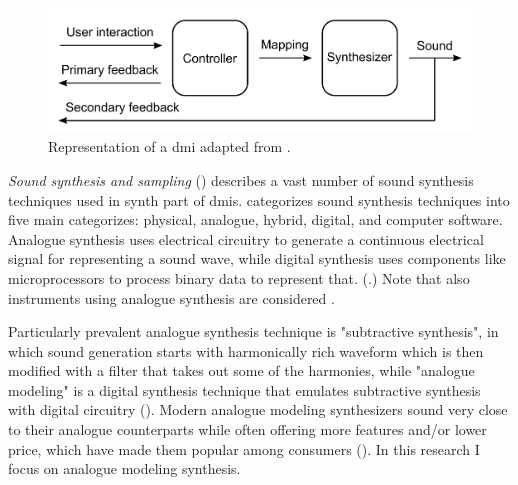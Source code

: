 \begin{figure}[h]
	\centering
	\includegraphics[width=0.8\linewidth]{figures/dmi.png}
	\caption{Representation of a \gls{dmi} adapted from \textcite{miranda-wanderley2006}.}
	\label{dmi}
\end{figure}

\textit{Sound synthesis and sampling} (\cite{russ2009}) describes a vast number of sound synthesis techniques used in \gls{synth} part of \glspl{dmi}. \textcite{russ2009} categorizes sound synthesis techniques into five main categorizes: physical, analogue, hybrid, digital, and computer software. Analogue synthesis uses electrical circuitry to generate a continuous electrical signal for representing a sound wave, while digital synthesis uses components like microprocessors to process binary data to represent that. (\cite{russ2009}.) Note that also instruments using analogue synthesis are considered .

Particularly prevalent analogue synthesis technique is "subtractive synthesis", in which sound generation starts with harmonically rich waveform which is then modified with a filter that takes out some of the harmonies, while "analogue modeling" is a digital synthesis technique that emulates subtractive synthesis with digital circuitry (\cite{russ2009}). Modern analogue modeling synthesizers sound very close to their analogue counterparts while often offering more features and/or lower price, which have made them popular among consumers (\cite{russ2009}). In this research I focus on analogue modeling synthesis.